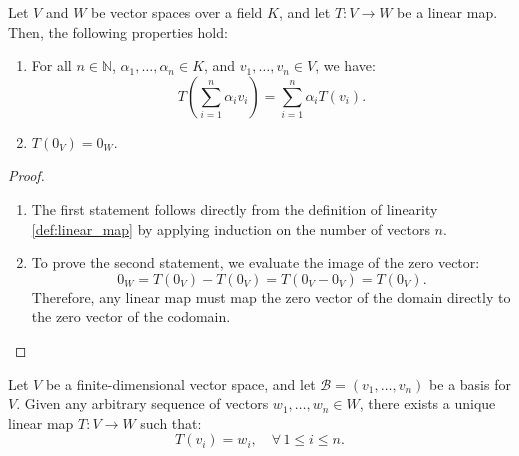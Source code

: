 \begin{proposition}
\label{prop:properties_linear_maps}
Let $V$ and $W$ be vector spaces over a field $K$, and let $T: V \to W$ be a linear map. Then, the following properties hold:
\begin{enumerate}
    \item For all $n \in \mathbb{N}$, $\alpha_1, \dots, \alpha_n \in K$, and $v_1, \dots, v_n \in V$, we have:
    \[
    T\left( \sum_{i=1}^n \alpha_i v_i \right) = \sum_{i=1}^n \alpha_i T(v_i).
    \]
    \item $T(0_V) = 0_W$.
\end{enumerate}
\end{proposition}

\begin{proof}
\begin{enumerate}
    \item The first statement follows directly from the definition of linearity \eqref{def:linear_map} by applying induction on the number of vectors $n$.
    \item To prove the second statement, we evaluate the image of the zero vector:
    \[
    0_W = T(0_V) - T(0_V) = T(0_V - 0_V) = T(0_V).
    \]
    Therefore, any linear map must map the zero vector of the domain directly to the zero vector of the codomain.
\end{enumerate}
\end{proof}

\begin{theorem}
\label{thm:existence_uniqueness_linear_map}
Let $V$ be a finite-dimensional vector space, and let $\mathcal{B} = (v_1, \dots, v_n)$ be a basis for $V$. Given any arbitrary sequence of vectors $w_1, \dots, w_n \in W$, there exists a unique linear map $T: V \to W$ such that:
\[
T(v_i) = w_i, \quad \forall \, 1 \le i \le n.
\]
\end{theorem}

